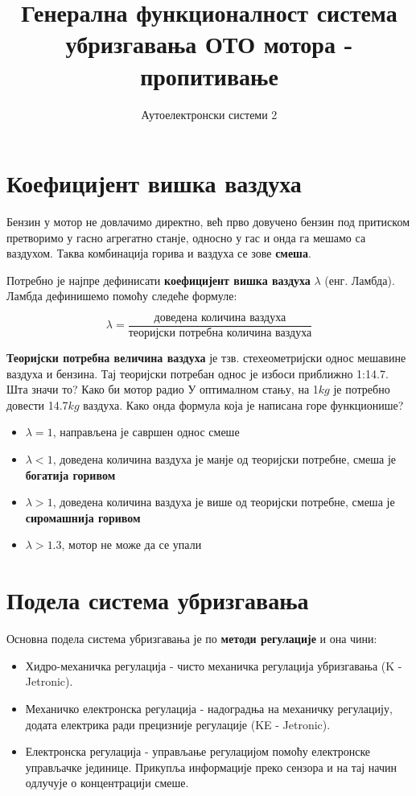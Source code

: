 \documentclass[12pt]{article}
\title{Генерална функционалност система убризгавања ОТО мотора - пропитивање}
\author{Аутоелектронски системи 2}
\date{}
\begin{document}
\maketitle


\section{Коефицијент вишка ваздуха}

Бензин у мотор не довлачимо директно, већ прво довучено бензин под притиском претворимо у 
гасно агрегатно станје, односно у гас и онда  га мешамо са ваздухом. Таква комбинација горива
и ваздуха се зове \textbf{смеша}.

Потребно је најпре дефинисати \textbf{коефицијент вишка ваздуха} $\lambda$ (енг. Ламбда). 
Ламбда дефинишемо помоћу следеће формуле: 

\begin{equation}
    \lambda = \frac{\text{доведена количина ваздуха}}{\text{теоријски потребна количина ваздуха}}
\end{equation}

\textbf{Теоријски потребна величина ваздуха} је тзв. стехеометријски однос мешавине ваздуха и бензина.
Тај теоријски потребан однос је избоси приближно 1:14.7. Шта значи то? Како би мотор радио У
оптималном стању, на 1$kg$ је потребно довести 14.7$kg$ ваздуха. Како онда формула која је написана 
горе функционише? 

\begin{itemize}
    \item $\lambda = 1$, направљена је савршен однос смеше
    \item $\lambda < 1$, доведена количина ваздуха је манје од теоријски потребне, смеша је \textbf{богатија горивом}
    \item $\lambda > 1$, доведена количина ваздуха је више од теоријски потребне, смеша је \textbf{сиромашнија горивом}
    \item $\lambda > 1.3$, мотор не може да се упали
\end{itemize}

\section{Подела система убризгавања}

Основна подела система убризгавања је по \textbf{методи регулације} и она чини: 

\begin{itemize}
    \item Хидро-механичка регулација - чисто механичка регулација убризгавања (K - Jetronic).
    \item Механичко електронска регулација - надоградња на механичку регулацију, додата
            електрика ради прецизније регулације (KE - Jetronic).
    \item Електронска регулација - управљање регулацијом помоћу електронске управљачке 
            јединице. Прикупља информације преко сензора и на тај начин одлучује о 
            концентрацији смеше.
\end{itemize}
\end{document}
